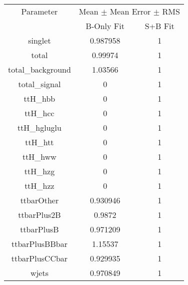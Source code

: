 \begin{table}
\centering

\begin{tabular}{ccc}
\toprule
Parameter & \multicolumn{2}{c}{Mean $\pm$ Mean Error $\pm$ RMS}\\
 & B-Only Fit & S+B Fit\\
\midrule
singlet & \num{0.987958} & \num{1}\\
total & \num{0.99974} & \num{1}\\
total\_background & \num{1.03566} & \num{1}\\
total\_signal & \num{0} & \num{1}\\
ttH\_hbb & \num{0} & \num{1}\\
ttH\_hcc & \num{0} & \num{1}\\
ttH\_hgluglu & \num{0} & \num{1}\\
ttH\_htt & \num{0} & \num{1}\\
ttH\_hww & \num{0} & \num{1}\\
ttH\_hzg & \num{0} & \num{1}\\
ttH\_hzz & \num{0} & \num{1}\\
ttbarOther & \num{0.930946} & \num{1}\\
ttbarPlus2B & \num{0.9872} & \num{1}\\
ttbarPlusB & \num{0.971209} & \num{1}\\
ttbarPlusBBbar & \num{1.15537} & \num{1}\\
ttbarPlusCCbar & \num{0.929935} & \num{1}\\
wjets & \num{0.970849} & \num{1}\\
\bottomrule
\end{tabular}
\end{table}